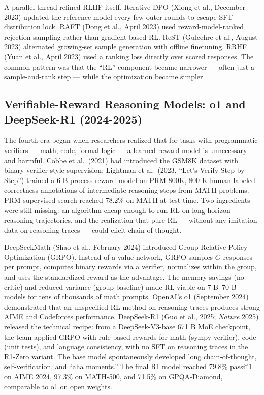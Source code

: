 A parallel thread refined RLHF itself. Iterative DPO (Xiong et al., December 2023) updated the reference model every few outer rounds to escape SFT-distribution lock. RAFT (Dong et al., April 2023) used reward-model-ranked rejection sampling rather than gradient-based RL. ReST (Gulcehre et al., August 2023) alternated growing-set sample generation with offline finetuning. RRHF (Yuan et al., April 2023) used a ranking loss directly over scored responses. The common pattern was that the ``RL'' component became narrower --- often just a sample-and-rank step --- while the optimization became simpler.

\subsection{Verifiable-Reward Reasoning Models: o1 and DeepSeek-R1 (2024-2025)}\label{verifiable-reward-reasoning-models-o1-and-deepseek-r1-2024-2025}

The fourth era began when researchers realized that for tasks with programmatic verifiers --- math, code, formal logic --- a learned reward model is unnecessary and harmful. Cobbe et al.~(2021) had introduced the GSM8K dataset with binary verifier-style supervision; Lightman et al.~(2023, ``Let's Verify Step by Step'') trained a 6 B process reward model on PRM-800K, 800 K human-labeled correctness annotations of intermediate reasoning steps from MATH problems. PRM-supervised search reached 78.2\% on MATH at test time. Two ingredients were still missing: an algorithm cheap enough to run RL on long-horizon reasoning trajectories, and the realization that pure RL --- without any imitation data on reasoning traces --- could elicit chain-of-thought.

DeepSeekMath (Shao et al., February 2024) introduced Group Relative Policy Optimization (GRPO). Instead of a value network, GRPO samples \(G\) responses per prompt, computes binary rewards via a verifier, normalizes within the group, and uses the standardized reward as the advantage. The memory savings (no critic) and reduced variance (group baseline) made RL viable on 7 B--70 B models for tens of thousands of math prompts. OpenAI's o1 (September 2024) demonstrated that an unspecified RL method on reasoning traces produces strong AIME and Codeforces performance. DeepSeek-R1 (Guo et al., 2025; \emph{Nature} 2025) released the technical recipe: from a DeepSeek-V3-base 671 B MoE checkpoint, the team applied GRPO with rule-based rewards for math (sympy verifier), code (unit tests), and language consistency, with no SFT on reasoning traces in the R1-Zero variant. The base model spontaneously developed long chain-of-thought, self-verification, and ``aha moments.'' The final R1 model reached 79.8\% pass@1 on AIME 2024, 97.3\% on MATH-500, and 71.5\% on GPQA-Diamond, comparable to o1 on open weights.

